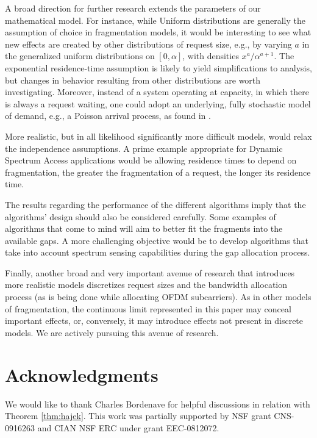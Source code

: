 \documentclass{amsart}
\begin{document}
A broad direction for further research extends the parameters of our
mathematical model.  For instance, while Uniform distributions are
generally the assumption of choice in fragmentation models, it would
be interesting to see what new effects are created by other
distributions of request size, e.g., by varying $a$ in the
generalized uniform distributions on $[0,\alpha]$, with densities
$x^a/\alpha^{a + 1}.$  The exponential residence-time assumption is
likely to yield simplifications to analysis,  but changes
in behavior resulting from other distributions are worth
investigating. Moreover, instead of a system operating at capacity, in which there
is always a request waiting, one could
adopt an underlying, fully stochastic model of demand, e.g., a
Poisson arrival process, as found in \cite{KipnisR1990}.

More realistic, but in all likelihood significantly more difficult
models, would relax the independence assumptions.  A prime example
appropriate for Dynamic Spectrum Access applications would be allowing
residence times to depend on fragmentation, the greater the
fragmentation of a request, the longer its residence time.

The results regarding the performance of the different algorithms imply that the algorithms' design should also be considered carefully. Some examples of algorithms that come to mind will aim to better fit the fragments into the available gaps. A more challenging objective would be to develop algorithms that take into account spectrum sensing capabilities during the gap allocation process.

Finally, another broad and very important avenue of research that
introduces more realistic models discretizes request sizes and the
bandwidth allocation process (as is being done while allocating OFDM subcarriers).  As in other models of fragmentation,
the continuous limit represented in this paper may conceal important
effects, or, conversely, it may introduce effects not present in
discrete models.  We are actively pursuing this avenue of research.

\section{Acknowledgments}
We would like to thank Charles Bordenave for helpful discussions in relation with Theorem \ref{thm:hajek}.
This work was partially supported by NSF grant CNS-0916263 and CIAN NSF ERC under grant EEC-0812072.
\end{document}
